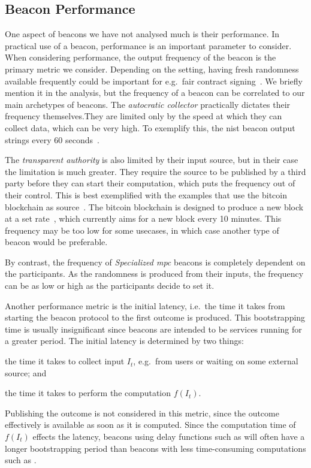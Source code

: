 \subsection{Beacon Performance}
One aspect of beacons we have not analysed much is their performance.
In practical use of a beacon, performance is an important parameter to consider.
When considering performance, the output frequency of the beacon is the primary metric we consider.
Depending on the setting, having fresh randomness available frequently could be important for e.g.\ fair contract signing~\cite{rabin1983transaction}.
We briefly mention it in the analysis, but the frequency of a beacon can be correlated to our main archetypes of beacons.
The \emph{autocratic collector} practically dictates their frequency themselves.They are limited only by the speed at which they can collect data, which can be very high.
To exemplify this, the \gls{nist} beacon output strings every 60 seconds~\cite{nistbeacon}.

The \emph{transparent authority} is also limited by their input source, but in their case the limitation is much greater.
They require the source to be published by a third party before they can start their computation, which puts the frequency out of their control.
This is best exemplified with the examples that use the bitcoin blockchain as source~\cite{bonneau2015bitcoin, bentov2016bitcoin, bunz2017proofsof}.
The bitcoin blockchain is designed to produce a new block at a set rate~\cite{nakamoto2008bitcoin}, which currently aims for a new block every 10 minutes.
This frequency may be too low for some usecases, in which case another type of beacon would be preferable.

By contrast, the frequency of \emph{Specialized \gls{mpc}} beacons is completely dependent on the participants.
As the randomness is produced from their inputs, the frequency can be as low or high as the participants decide to set it.

Another performance metric is the initial latency, i.e.\ the time it takes from starting the beacon protocol to the first outcome is produced.
This bootstrapping time is usually insignificant since beacons are intended to be services running for a greater period.
The initial latency is determined by two things:
\begin{enumberate*}
    \item the time it takes to collect input $I_t$, e.g.\ from users or waiting on some external source; and
    \item the time it takes to perform the computation $f(I_t)$.
\end{enumberate*}
Publishing the outcome is not considered in this metric, since the outcome effectively is available as soon as it is computed.
Since the computation time of $f(I_t)$ effects the latency, beacons using delay functions such as  will often have a longer bootstrapping period than beacons with less time-consuming computations such as .
